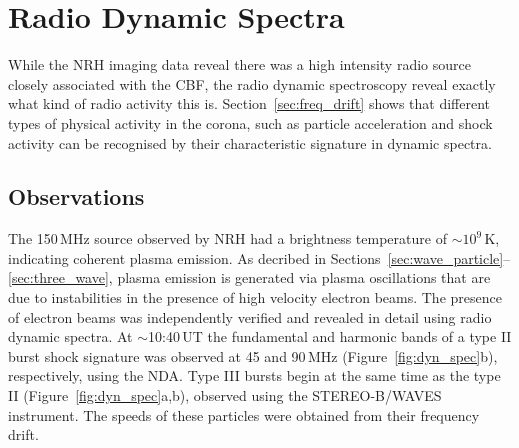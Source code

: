 \section{Radio Dynamic Spectra}\label{sec:20}

While the NRH imaging data reveal there was a high intensity radio source closely associated with the CBF, the radio dynamic spectroscopy reveal exactly what kind of radio activity this is. Section~\ref{sec:freq_drift} shows that different types of physical activity in the corona, such as particle acceleration and shock activity can be recognised by their characteristic signature in dynamic spectra. 

\subsection{Observations}
The 150\,MHz source observed by NRH had a brightness temperature of $\sim$$10^9$\,K, indicating coherent plasma emission. As decribed in Sections~\ref{sec:wave_particle}--\ref{sec:three_wave}, plasma emission is generated via plasma oscillations that are due to instabilities in the presence of high velocity electron beams. The presence of electron beams was independently verified and revealed in detail using radio dynamic spectra. At $\sim$10:40\,UT the fundamental and harmonic bands of a type II burst shock signature was observed at 45 and 90\,MHz (Figure~\ref{fig:dyn_spec}b), respectively, using the NDA. Type III bursts begin at the same time as the type II (Figure~\ref{fig:dyn_spec}a,b), observed using the STEREO-B/WAVES instrument. The speeds of these particles were obtained from their frequency drift.

